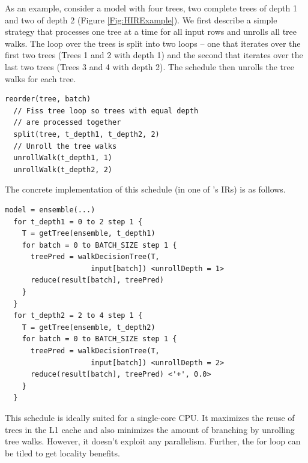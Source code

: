As an example, consider a model with four trees, two complete
trees of depth 1 and two of depth 2 (Figure \ref{Fig:HIRExample}).
We first describe a simple strategy that processes one tree at a time 
for all input rows and unrolls all tree walks. 
The loop over the trees is split into two loops -- one that
iterates over the first two trees (Trees 1 and 2 with depth 1) and 
the second that iterates over the last two trees (Trees 3 and 4 with
depth 2). The \Treebeard{} schedule then unrolls the tree walks for each tree.
\begin{lstlisting}[style=c++]
  reorder(tree, batch)
  // Fiss tree loop so trees with equal depth 
  // are processed together  
  split(tree, t_depth1, t_depth2, 2)
  // Unroll the tree walks
  unrollWalk(t_depth1, 1)
  unrollWalk(t_depth2, 2)
\end{lstlisting}
The concrete implementation of this schedule (in one of \Treebeard{}'s IRs) 
is as follows.
\begin{lstlisting}[style=c++]
  model = ensemble(...)
  for t_depth1 = 0 to 2 step 1 {
    T = getTree(ensemble, t_depth1)
    for batch = 0 to BATCH_SIZE step 1 {
      treePred = walkDecisionTree(T, 
                    input[batch]) <unrollDepth = 1>
      reduce(result[batch], treePred)
    }
  }
  for t_depth2 = 2 to 4 step 1 {
    T = getTree(ensemble, t_depth2)
    for batch = 0 to BATCH_SIZE step 1 {
      treePred = walkDecisionTree(T,
                    input[batch]) <unrollDepth = 2>
      reduce(result[batch], treePred) <'+', 0.0>
    }
  }
\end{lstlisting}
This schedule is ideally suited for a single-core CPU. It maximizes 
the reuse of trees in the L1 cache and also minimizes the amount of
branching by unrolling tree walks. However, it doesn't exploit  
any parallelism. 
Further, the  for loop can be tiled to get locality benefits. 

